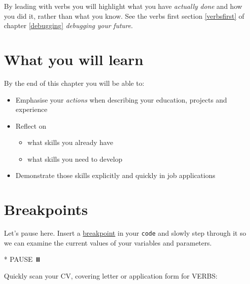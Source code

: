 \documentclass[
]{book}
\newenvironment{Shaded}{\begin{snugshade}}{\end{snugshade}}
\newcommand{\NormalTok}[1]{#1}
\newcommand{\SpecialStringTok}[1]{\textcolor[rgb]{0.31,0.60,0.02}{#1}}
\providecommand{\tightlist}{%
  \setlength{\itemsep}{0pt}\setlength{\parskip}{0pt}}
\begin{document}
By leading with verbs you will highlight what you have \emph{actually done} and how you did it, rather than what you know. See the verbs first section \ref{verbsfirst} of chapter \ref{debugging} \emph{debugging your future}.

\hypertarget{ilo17}{%
\section{What you will learn}\label{ilo17}}

By the end of this chapter you will be able to:

\begin{itemize}
\tightlist
\item
  Emphasise your \emph{actions} when describing your education, projects and experience
\item
  Reflect on

  \begin{itemize}
  \tightlist
  \item
    what skills you already have
  \item
    what skills you need to develop
  \end{itemize}
\item
  Demonstrate those skills explicitly and quickly in job applications
\end{itemize}

\hypertarget{bp17}{%
\section{Breakpoints}\label{bp17}}

Let's pause here. Insert a \href{https://en.wikipedia.org/wiki/Breakpoint}{breakpoint} in your \texttt{code} and slowly step through it so we can examine the current values of your variables and parameters.

\begin{Shaded}
\begin{Highlighting}[]
\SpecialStringTok{* }\NormalTok{PAUSE ⏸️}
\end{Highlighting}
\end{Shaded}

Quickly scan your CV, covering letter or application form for VERBS:
\end{document}

